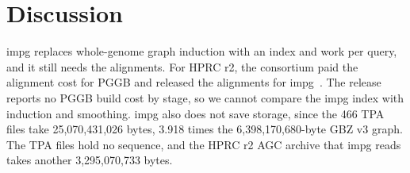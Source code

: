 \section{Discussion}
\label{sec:discussion}

impg replaces whole-genome graph induction with an index and work per query, and it still needs the alignments.
For HPRC r2, the consortium paid the alignment cost for PGGB and released the alignments for impg~\citep{HPRC2026resources}.
The release reports no PGGB build cost by stage, so we cannot compare the impg index with induction and smoothing.
impg also does not save storage, since the 466 TPA files take 25,070,431,026 bytes, 3.918 times the 6,398,170,680-byte GBZ v3 graph.
The TPA files hold no sequence, and the HPRC r2 AGC archive that impg reads takes another 3,295,070,733 bytes.

